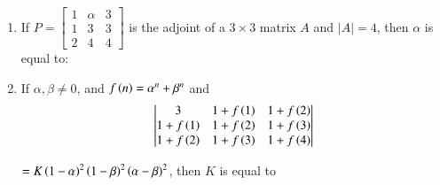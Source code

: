 \documentclass[journal,12pt,twocolumn]{IEEEtran}
\theoremstyle{remark}
\begin{document}
\begin{enumerate}
	\item If $P = \begin{bmatrix}1&\alpha&3\\1&3&3\\2&4&4\end{bmatrix}$ is the adjoint of a $3\times3$ matrix $A$ and $|A| = 4$, then $\alpha$ is equal to:
	\hfill{}
        \begin{enumerate}[label={(\alph*)}]
        \end{enumerate}

	\item If $\alpha,\beta\neq 0$, and $f\left(n\right) = \alpha^n + \beta^n$ and
		\newline
		\begin{align*}
			\begin{vmatrix}
				3 & 1+f\left(1\right) & 1+f\left(2\right)\\
				1+f\left(1\right) & 1+f\left(2\right) & 1+f\left(3\right)\\
				1+f\left(2\right) & 1+f\left(3\right) & 1+f\left(4\right)
			\end{vmatrix}
		\end{align*}

		$=K\left(1-\alpha\right)^2\left(1-\beta\right)^2\left(\alpha-\beta\right)^2$,
		then $K$ is equal to

	\hfill{}
        \begin{enumerate}[label={(\alph*)}]
        \end{enumerate}



\end{enumerate}
\end{document}
